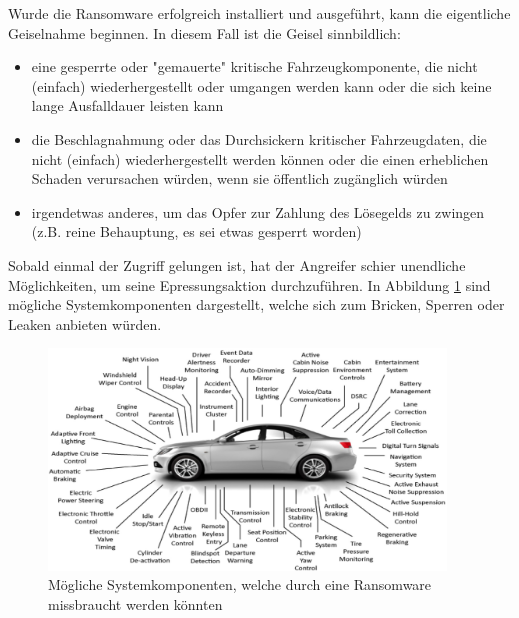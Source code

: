 Wurde die Ransomware erfolgreich installiert und ausgeführt, kann die 
eigentliche Geiselnahme beginnen. In diesem Fall ist die Geisel sinnbildlich:

\begin{itemize}
    \item eine gesperrte oder "gemauerte" kritische Fahrzeugkomponente, die nicht 
    (einfach) wiederhergestellt oder umgangen werden kann oder die sich keine lange 
    Ausfalldauer leisten kann
    \item die Beschlagnahmung oder das Durchsickern kritischer Fahrzeugdaten, die nicht 
    (einfach) wiederhergestellt werden können oder die einen erheblichen Schaden 
    verursachen würden, wenn sie öffentlich zugänglich würden
    \item irgendetwas anderes, um das Opfer zur Zahlung des Lösegelds zu zwingen 
    (z.B. reine Behauptung, es sei etwas gesperrt worden)
\end{itemize}

Sobald einmal der Zugriff gelungen ist, hat der Angreifer schier unendliche 
Möglichkeiten, um seine Epressungsaktion durchzuführen. In Abbildung \ref{fig:Erpressung} sind 
mögliche Systemkomponenten dargestellt, welche sich zum Bricken, Sperren oder 
Leaken anbieten würden.
\newline

\begin{figure}[htbp!]
    \centering
    \includegraphics[width=0.94\textwidth]{Images/Diagnostic-Scanning-1.jpg}
    \caption{Mögliche Systemkomponenten, welche durch eine Ransomware missbraucht werden könnten}
    \label{fig:Erpressung}
\end{figure}

